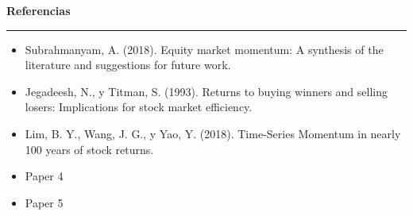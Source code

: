 \documentclass[a0,portrait]{a0poster}
\newcommand{\customsection}[1]{
    \begin{center}
        \vspace{1cm} %
        \color{black}
        \textbf{\Huge #1}
        \color{miRojo}
        \vspace{.5cm} %
        \hrule height 2.5pt  %
        \vspace{.5cm} %
    \end{center}
}
\begin{document}
\begin{multicols}{2}
    \customsection{Referencias}
    \par
         \begin{itemize}
            \item Subrahmanyam, A. (2018). Equity market momentum: A synthesis of the literature and suggestions for future work.
            \item Jegadeesh, N., y Titman, S. (1993). Returns to buying winners and selling losers: Implications for stock market efficiency.
            \item Lim, B. Y., Wang, J. G., y Yao, Y. (2018). Time-Series Momentum in nearly 100 years of stock returns.            \item Paper 4
            \item Paper 5
        \end{itemize}
        
    
    
    
    
\end{multicols}
\end{document}
